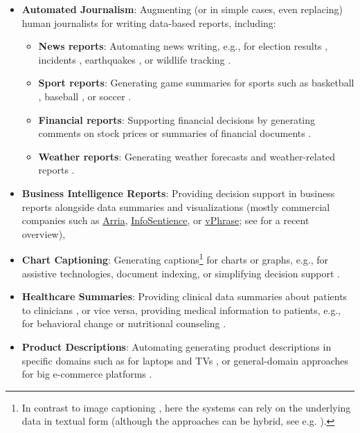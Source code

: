 \begin{itemize}
    \item \textbf{Automated Journalism}: Augmenting (or in simple cases, even replacing) human journalists for writing data-based reports, including:
          \begin{itemize}
              \item \textbf{News reports}: Automating news writing, e.g., for election results \cite{leppanen2017data}, incidents \cite{vanderleeCACAPODatasetMultilingual2020}, earthquakes \cite{oremus2014first}, or wildlife tracking \cite{siddharthan2012blogging,ponnamperuma2013tag2blog}.
              \item \textbf{Sport reports}: Generating game summaries for sports such as basketball \cite{wiseman2017challenges,thomson2020sportsett}, baseball \cite{puduppullyDatatotextGenerationEntity2019}, or soccer \cite{van2017pass}.
              \item \textbf{Financial reports}: Supporting financial decisions by generating comments on stock prices \cite{murakami2017learning,aoki2018generating} or summaries of financial documents \cite{chapman2022towards}.
              \item \textbf{Weather reports}: Generating weather forecasts and weather-related reports \cite{goldberg1994using,belz2005corpus,belz2008automatic,angeli-etal-2010-simple,balakrishnan2019constrained}.
          \end{itemize}
    \item \textbf{Business Intelligence Reports}: Providing decision support in business reports alongside data summaries and visualizations (mostly commercial companies such as \href{https://www.arria.com}{Arria}, \href{https://infosentience.com}{InfoSentience}, or \href{https://www.vphrase.com}{vPhrase}; see \citealp{daleNavigatingTextGeneration2023} for a recent overview),
    \item \textbf{Chart Captioning}: Generating captions\footnote{In contrast to image captioning \cite{stefanini2022show}, here the systems can rely on the underlying data in textual form (although the approaches can be hybrid, see e.g. \citealp{kantharaj2022chart}).} for charts or graphs, e.g., for assistive technologies, document indexing, or simplifying decision support \cite{demirGeneratingTextualSummaries2008,demirSummarizingInformationGraphics2012,obeidCharttoTextGeneratingNatural2020,kantharaj2022chart}.
    \item \textbf{Healthcare Summaries}: Providing  clinical data summaries about patients to clinicians \cite{portet2009automatic,scott2013data}, or vice versa, providing medical information to patients, e.g., for behavioral change \cite{reiter2003lessons} or nutritional counseling \cite{balloccu-reiter-2022-comparing}.
    \item \textbf{Product Descriptions}: Automating generating product descriptions in specific domains such as for laptops and TVs \cite{wen2015toward,wen2016multi}, or general-domain approaches for big e-commerce platforms \cite{shaoControllableDiverseText2021,kotoCanPretrainedLanguage2022}.
\end{itemize}


